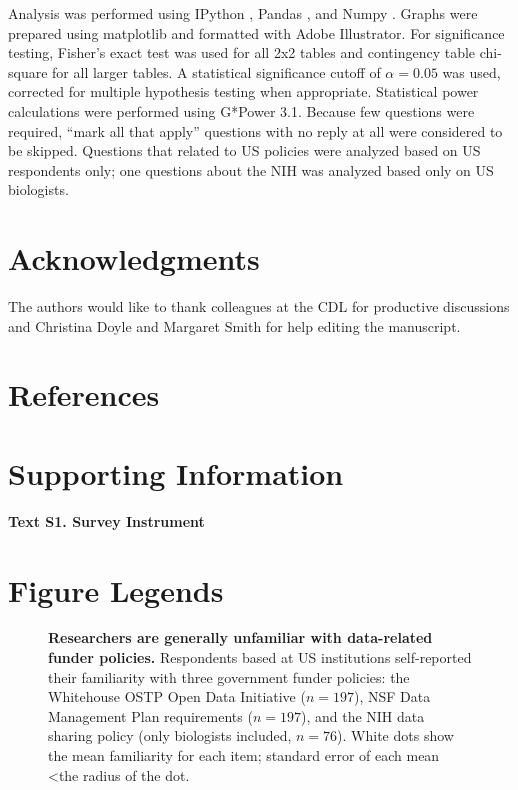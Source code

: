 \documentclass[10pt]{article}
\begin{document}
Analysis was performed using IPython \cite{perez_ipython:_2007}, Pandas \cite{mckinney_data_2010}, and Numpy \cite{van_der_walt_numpy_2011}.
Graphs were prepared using matplotlib \cite{hunter_matplotlib:_2007} and formatted with Adobe Illustrator.
For significance testing, Fisher's exact test was used for all 2x2 tables and contingency table chi-square for all larger tables.
A statistical significance cutoff of $\alpha=0.05$ was used, corrected for multiple hypothesis testing when appropriate.
Statistical power calculations were performed using G*Power 3.1\cite{faul_g*_2007}.
Because few questions were required,  ``mark all that apply'' questions with no reply at all were considered to be skipped.
Questions that related to US policies were analyzed based on US respondents only; one questions about the NIH was analyzed based only on US biologists.

\section*{Acknowledgments}
The authors would like to thank colleagues at the CDL for productive discussions and Christina Doyle and Margaret Smith for help editing the manuscript.


\section*{References}



\section*{Supporting Information}
{\bf Text S1. Survey Instrument}


\section*{Figure Legends}

\begin{figure}[!ht]
\begin{center}
\end{center}
\caption{
{\bf Researchers are generally unfamiliar with data-related funder policies.}
Respondents based at US institutions self-reported their familiarity with three government funder policies: the Whitehouse OSTP Open Data Initiative ($n=197$), NSF Data Management Plan requirements ($n=197$), and the NIH data sharing policy (only biologists included, $n=76$). 
White dots show the mean familiarity for each item; standard error of each mean \textless the radius of the dot.
}
\label{fig:policy_knowledge}
\end{figure}
\end{document}
